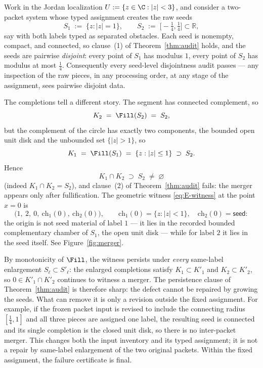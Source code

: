 \begin{example}\label{ex:merger}
Work in the Jordan localization $U:=\{z\in\C:|z|<3\}$, and consider a two-packet
system whose typed assignment creates the raw seeds
\[
S_1\;:=\;\{z:|z|=1\},
\qquad
S_2\;:=\;\bigl[-\tfrac14,\tfrac14\bigr]\subset\mathbb R,
\]
say with both labels typed as separated obstacles.
Each seed is nonempty, compact, and connected, so clause~(1) of Theorem~\ref{thm:audit} holds,
and the seeds are pairwise \emph{disjoint}: every point of $S_1$ has modulus $1$,
every point of $S_2$ has modulus at most $\tfrac14$. Consequently every seed-level
disjointness audit passes --- any inspection of the raw pieces, in any processing
order, at any stage of the assignment, sees pairwise disjoint data.

The completions tell a different story. The segment has connected complement, so
\[
K_2\;=\;\Fill(S_2)\;=\;S_2 ,
\]
but the complement of the circle has exactly two components, the bounded open unit
disk and the unbounded set $\{|z|>1\}$, so
\[
K_1\;=\;\Fill(S_1)\;=\;\{z:|z|\le1\}\;\supset\;S_2 .
\]
Hence
\[
K_1\cap K_2\;\supset\;S_2\;\neq\;\varnothing
\]
(indeed $K_1\cap K_2=S_2$), and clause~(2) of Theorem~\ref{thm:audit} fails: the
merger appears only after fullification. The geometric witness \eqref{eq:E-witness}
at the point $x=0$ is
\[
\bigl(1,\ 2,\ 0,\ \mathrm{ch}_1(0),\ \mathrm{ch}_2(0)\bigr),
\qquad
\mathrm{ch}_1(0)=\{z:|z|<1\},
\quad
\mathrm{ch}_2(0)=\textsf{seed}:
\]
the origin is not seed material of label $1$ --- it lies in the recorded bounded
complementary chamber of $S_1$, the open unit disk --- while for label $2$ it lies in
the seed itself. See Figure~\ref{fig:merger}.

By monotonicity of $\Fill$, the witness persists under \emph{every} same-label
enlargement $S_\ell\subset S'_\ell$: the enlarged completions satisfy
$K_1\subset K'_1$ and $K_2\subset K'_2$, so $0\in K'_1\cap K'_2$ continues to
witness a merger. The persistence clause of Theorem~\ref{thm:audit} is therefore
sharp: the defect cannot be repaired by growing the seeds. What can remove it is
only a revision outside the fixed assignment.  For example, if the frozen
packet input is revised to include the connecting radius
$[\tfrac14,1]$ and all three pieces are assigned one label, the resulting
seed is connected and its single completion is the closed unit disk, so
there is no inter-packet merger.  This changes both the input inventory and
its typed assignment; it is not a repair by same-label enlargement of the
two original packets.  Within the fixed assignment, the failure
certificate is final.


\end{example}
